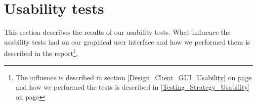 \section{Usability tests}
\label{Appendix_Test_Usability}
This section describes the results of our usability tests. What influence the usability tests had on our graphical user interface and how we performed them is described in the report\footnote{The influence is described in section \ref {Design_Client_GUI_Usability} on page \pageref{Design_Client_GUI_Usability} and how we performed the tests is described in \ref{Testing_Strategy_Usability} on page \pageref{Testing_Strategy_Usability}}.